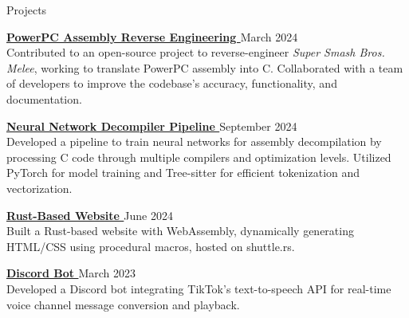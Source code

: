\documentclass{resume}
\newcommand{\scaledfaExternalLink}{\raisebox{0.1\height}{\scalebox{0.7}{\faExternalLink*}}}
\begin{document}
\begin{rSection}{Projects}

	\item {\bf \href{https://github.com/search?q=repo\%3Adoldecomp\%2Fmelee++author\%3Awyatt-avilla&type=pullrequests&ref=advsearch}{PowerPC Assembly Reverse Engineering \scaledfaExternalLink}} {\hfill March 2024} \\
	Contributed to an open-source project to reverse-engineer \textit{Super Smash Bros. Melee}, working to translate PowerPC assembly into C. Collaborated with a team of developers to improve the codebase's accuracy, functionality, and documentation.

	\item {\bf \href{https://github.com/wyatt-avilla/sunbird}{Neural Network Decompiler Pipeline \scaledfaExternalLink}} {\hfill September 2024} \\
	Developed a pipeline to train neural networks for assembly decompilation by processing C code through multiple compilers and optimization levels. Utilized PyTorch for model training and Tree-sitter for efficient tokenization and vectorization.

	\item {\bf \href{https://github.com/wyatt-avilla/feframe}{Rust-Based Website \scaledfaExternalLink}} {\hfill June 2024} \\
	Built a Rust-based website with WebAssembly, dynamically generating HTML/CSS using procedural macros, hosted on shuttle.rs.

	\item {\bf \href{https://github.com/wyatt-avilla/discord-tiktok-tts-bot}{Discord Bot \scaledfaExternalLink}} {\hfill March 2023} \\
	Developed a Discord bot integrating TikTok's text-to-speech API for real-time voice channel message conversion and playback.

\end{rSection}
\end{document}
